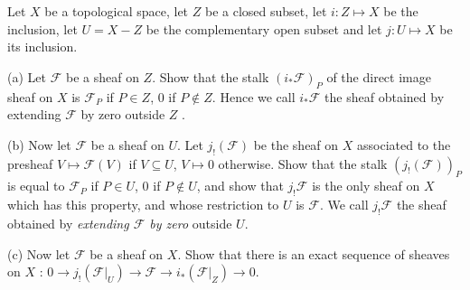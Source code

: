 \begin{exe}
	\label{2.1.19}
	Let $X$ be a topological space, let $Z$ be a closed subset, let $i : Z \mapsto X$ be the inclusion, let $U = X - Z$ be the complementary open subset and let $j : U \mapsto X$ be its inclusion.
	
	(a) Let $\mathscr{F}$ be a sheaf on $Z$. Show that the stalk $(i_{*}\mathscr{F})_{P}$ of the direct image sheaf on $X$ is $\mathscr{F}_{P}$ if $P \in Z$, $0$ if $P \notin Z$. Hence we call $i_{*}\mathscr{F}$ the sheaf obtained by extending $\mathscr{F}$ by zero outside $Z$ .
	
	(b) Now let $\mathscr{F}$ be a sheaf on $U$. Let $j_{!}(\mathscr{F})$ be the sheaf on $X$ associated to the presheaf $V \mapsto \mathscr{F}(V)$ if $V \subseteq U$, $V \mapsto 0$ otherwise. Show that the stalk $(j_{!}(\mathscr{F}))_{P}$ is equal to $\mathscr{F}_{P}$ if $P \in U$, $0$ if $P \notin U$, and show that $j_{!}\mathscr{F}$ is the only sheaf on $X$ which has this property, and whose restriction to $U$ is $\mathscr{F}$. We call $j_{!}\mathscr{F}$ the sheaf obtained by \emph{extending $\mathscr{F}$ by zero} outside $U$.
	
	(c) Now let $\mathscr{F}$ be a sheaf on $X$. Show that there is an exact sequence of sheaves on $X$ : $0 \rightarrow j_{!}(\mathscr{F}|_{U}) \rightarrow \mathscr{F} \rightarrow i_{*}(\mathscr{F}|_{Z}) \rightarrow 0$.
\end{exe}

